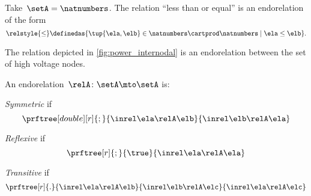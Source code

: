 \begin{example}
    Take~$\setA=\natnumbers$.
    The relation ``less than or equal'' is an endorelation of the form
    \begin{equation}
        \relstyle{\leq} \definedas  \{\tup{\ela,\elb}\in \natnumbers\cartprod \natnumbers\mid \ela \leq \elb\}.
    \end{equation}
\end{example}

\begin{example}
    The relation depicted in \cref{fig:power_internodal} is an endorelation between the set of high voltage nodes.
\end{example}

\begin{definition}
    \label{def:properties-endorelations}
    An endorelation~$\relA\colon \setA\mto \setA$ is:
    \begin{compactitem}
        \item \emph{Symmetric} if %
        \begin{equation}
            \prftree[double][r]{;}{
                \inrel \ela \relA \elb
            }{
                \inrel \elb \relA \ela
            }
        \end{equation}
        \item \emph{Reflexive} if%
        \begin{equation}
            \prftree[r]{;}{
                \true
            }{
                \inrel \ela \relA \ela
            }
        \end{equation}
        \item \emph{Transitive} if %
        \begin{equation}
            \prftree[r]{.}{
                \inrel \ela \relA \elb
            }{
                \inrel \elb \relA \elc
            }{
                \inrel \ela \relA \elc
            }
        \end{equation}
    \end{compactitem}
\end{definition}

